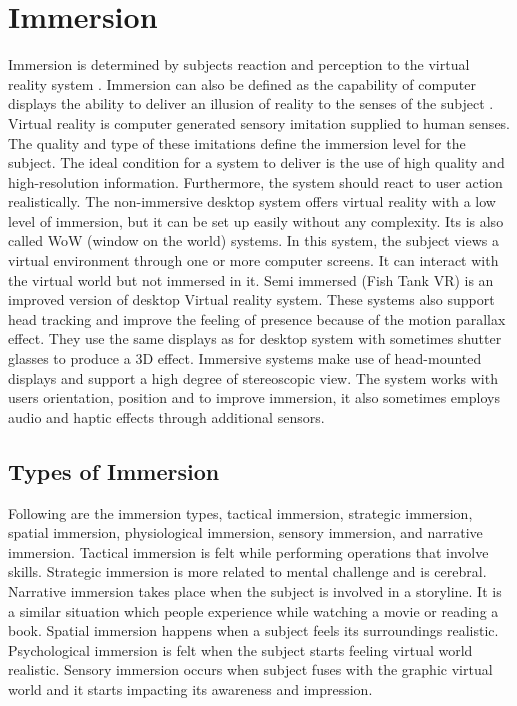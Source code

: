 \section{Immersion}
Immersion is determined by subjects reaction and perception to the virtual reality system \cite{witmer1998measuring}. Immersion can also be defined as the capability of computer displays the ability to deliver an illusion of reality to the senses of the subject \cite{slater1997framework}. Virtual reality is computer generated sensory imitation supplied to human senses. The quality and type of these imitations define the immersion level for the subject. The ideal condition for a system to deliver is the use of high quality and high-resolution information. Furthermore, the system should react to user action realistically. The non-immersive desktop system offers virtual reality with a low level of immersion, but it can be set up easily without any complexity. Its is also called WoW (window on the world) systems. In this system, the subject views a virtual environment through one or more computer screens. It can interact with the virtual world but not immersed in it. Semi immersed (Fish Tank VR) is an improved version of desktop Virtual reality system. These systems also support head tracking and improve the feeling of presence because of the motion parallax effect. They use the same displays as for desktop system with sometimes shutter glasses to produce a 3D effect. Immersive systems make use of head-mounted displays and support a high degree of stereoscopic view. The system works with users orientation, position and to improve immersion, it also sometimes employs audio and haptic effects through additional sensors.\cite{youngblut2003experience}

\subsection{Types of Immersion}
Following are the immersion types, tactical immersion, strategic immersion, spatial immersion, physiological immersion, sensory immersion, and narrative immersion. Tactical immersion is felt while performing operations that involve skills. Strategic immersion is more related to mental challenge and is cerebral. Narrative immersion takes place when the subject is involved in a storyline. It is a similar situation which people experience while watching a movie or reading a book. Spatial immersion happens when a subject feels its surroundings realistic. Psychological immersion is felt when the subject starts feeling virtual world realistic. Sensory immersion occurs when subject fuses with the graphic virtual world and it starts impacting its awareness and impression.\cite{harth2018different}

